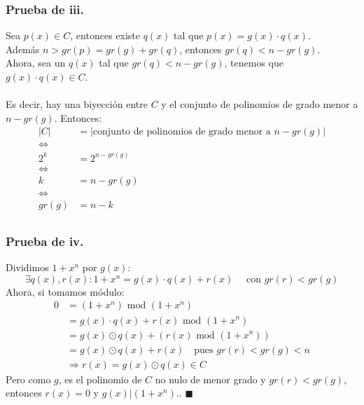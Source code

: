 \documentclass[11pt, a4paper]{article}
\theoremstyle{definition}
\begin{document}
\subsubsection*{Prueba de iii.}
Sea \(p(x) \in C\), entonces existe \(q(x)\) tal que \({ p(x) = g(x) \cdot q(x) .}\)\\ 
Además \({n > gr(p) = gr(g) + gr(q) }\), entonces \({ gr(q) < n - gr(g) .}\)\\
Ahora, sea un \(q(x)\) tal que \(gr(q) < n - gr(g)\), tenemos que \({ g(x) \cdot q(x) \in C. }\)\\ \\
Es decir, hay una biyección entre \(C\) y el conjunto de polinomios de grado menor a \({n - gr(g).}\) Entonces:
\begin{align*}
	|C| & = |\text{conjunto de polinomios de grado menor a } n - gr(g)| \\
      \iff & \\
  2^k & = 2^{n - gr(g)} \\
      \iff & \\
    k & = n - gr(g) \\
      \iff & \\
    gr(g) & = n - k \\
\end{align*}

\subsubsection*{Prueba de iv.}
Dividimos \(1+x^n\) por \(g(x)\):
\[ 
\exists q(x), r(x) : 1 + x^n = g(x) \cdot q(x) + r(x) \quad \text{ con } gr(r) < gr(g)
\]
Ahora, si tomamos módulo:
\begin{align*}
	0 & = (1 + x^n) \text{ mod } (1 + x^n) \\
    & = g(x) \cdot q(x) + r(x) \text{ mod } (1 + x^n) \\
    & = g(x) \odot q(x) + (r(x) \text{ mod } (1 + x^n)) \\
    & = g(x) \odot q(x) + r(x) \quad\text{pues } gr(r) < gr(g) < n \\
    &\Rightarrow r(x) = g(x) \odot q(x) \in C
\end{align*}
Pero como $g$, es el polinomio de $C$ no nulo de menor grado y \({gr(r) < gr(g),}\) entonces \({r(x) = 0}\) y \({g(x) | (1 + x^n).}\). $\blacksquare$
\end{document}
